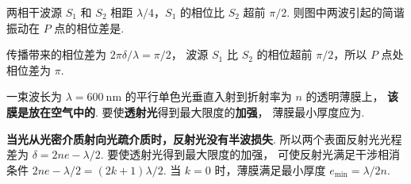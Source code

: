 \begin{textfig}
  \begin{problem}[本题2分]
    两相干波源 $S_1$ 和 $S_2$ 相距 $\lambda/4$，$S_1$ 的相位比 $S_2$ 超前 $\pi/2$.
    则图中两波引起的简谐振动在 $P$ 点的相位差是\result{$\pi$}.
  \end{problem}
  \textfigsplit\centering
\end{textfig}
\begin{solution}
  传播带来的相位差为 $2\pi\delta/\lambda = \pi/2$，
  波源 $S_1$ 比 $S_2$ 的相位超前 $\pi/2$，所以 $P$ 点处相位差为 $\pi$.
\end{solution}

\begin{problem}[本题3分]
  一束波长为 $\lambda = \qty{600}\nm$ 的平行单色光垂直入射到折射率为 $n$ 的透明薄膜上，
  \textbf{该膜是放在空气中的}. 要使\textbf{透射光}得到最大限度的\textbf{加强}，
  薄膜最小厚度应为.
\end{problem}
\scratch
\begin{solution}
  \textbf{当光从光密介质射向光疏介质时，反射光没有半波损失}.
  所以两个表面反射光光程差为 $\delta = 2ne - \lambda/2$. 要使透射光得到最大限度的加强，
  可使反射光满足干涉相消条件 $2ne - \lambda/2 = (2k + 1)\lambda/2$.
  当 $k = 0$ 时，薄膜满足最小厚度 $e_{\min} = \lambda/2n$.
\end{solution}

